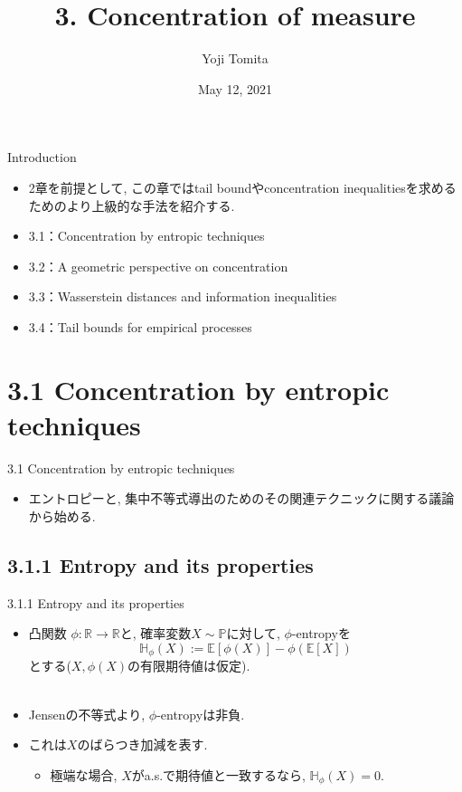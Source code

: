 \documentclass[aspectratio=169, dvipdfmx]{beamer}
\title{3. Concentration of measure}
\author{Yoji Tomita}
\date{May 12, 2021}
\newcommand{\ex}{\mathbb{E}}
\begin{document}
\maketitle

\begin{frame}{Introduction}
\begin{itemize}
    \item 2章を前提として, この章ではtail boundやconcentration inequalitiesを求めるためのより上級的な手法を紹介する.
    \item 3.1：Concentration by entropic techniques
    \item 3.2：A geometric perspective on concentration
    \item 3.3：Wasserstein distances and information inequalities
    \item 3.4：Tail bounds for empirical processes
\end{itemize}
\end{frame}

\section{3.1 Concentration by entropic techniques}

\begin{frame}{3.1 Concentration by entropic techniques}
\begin{itemize}
    \item エントロピーと, 集中不等式導出のためのその関連テクニックに関する議論から始める.
\end{itemize}
\end{frame}

\subsection{3.1.1 Entropy and its properties}
\begin{frame}{3.1.1 Entropy and its properties}
\begin{itemize}
    \item 凸関数 $\phi:\mathbb{R} \to \mathbb{R}$と, 確率変数$X\sim \mathbb{P}$に対して, $\phi$-entropyを
    \[\mathbb{H}_\phi(X) := \ex[\phi(X)] - \phi(\ex[X])\]
    とする($X, \phi(X)$の有限期待値は仮定).\\
    　
    \item Jensenの不等式より, $\phi$-entropyは非負.
    \item これは$X$のばらつき加減を表す.
    \begin{itemize}
        \item 極端な場合, $X$がa.s.で期待値と一致するなら, $\mathbb{H}_\phi(X) = 0$.
    \end{itemize}
\end{itemize}
\end{frame}
\end{document}

